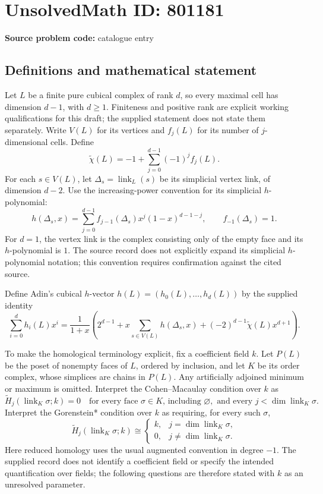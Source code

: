 \documentclass[11pt]{article}
\begin{document}
\section*{UnsolvedMath ID: 801181}
\textbf{Source problem code:} catalogue entry
\subsection{Definitions and mathematical statement}
Let \(L\) be a finite pure cubical complex of rank \(d\), so every maximal cell has dimension \(d-1\), with \(d\geq 1\). Finiteness and positive rank are explicit working qualifications for this draft; the supplied statement does not state them separately. Write \(V(L)\) for its vertices and \(f_j(L)\) for its number of \(j\)-dimensional cells. Define
\[
\widetilde\chi(L)=-1+\sum_{j=0}^{d-1}(-1)^j f_j(L).
\]
For each \(s\in V(L)\), let \(\Delta_s=\operatorname{link}_L(s)\) be its simplicial vertex link, of dimension \(d-2\). Use the increasing-power convention for its simplicial \(h\)-polynomial:
\[
h(\Delta_s,x)=\sum_{j=0}^{d-1} f_{j-1}(\Delta_s)x^j(1-x)^{d-1-j},\qquad f_{-1}(\Delta_s)=1.
\]
For \(d=1\), the vertex link is the complex consisting only of the empty face and its \(h\)-polynomial is \(1\). The source record does not explicitly expand its simplicial \(h\)-polynomial notation; this convention requires confirmation against the cited source.

Define Adin's cubical \(h\)-vector \(h(L)=(h_0(L),\ldots,h_d(L))\) by the supplied identity
\[
\sum_{i=0}^{d}h_i(L)x^i
=\frac{1}{1+x}\left(
2^{d-1}+x\sum_{s\in V(L)}h(\Delta_s,x)
+(-2)^{d-1}\widetilde\chi(L)x^{d+1}
\right).
\]

To make the homological terminology explicit, fix a coefficient field \(k\). Let \(P(L)\) be the poset of nonempty faces of \(L\), ordered by inclusion, and let \(K\) be its order complex, whose simplices are chains in \(P(L)\). Any artificially adjoined minimum or maximum is omitted. Interpret the Cohen--Macaulay condition over \(k\) as
\[
\widetilde H_j(\operatorname{link}_K\sigma;k)=0
\quad\text{for every face }\sigma\in K\text{, including }\varnothing,
\text{ and every }j<\dim\operatorname{link}_K\sigma.
\]
Interpret the Gorenstein* condition over \(k\) as requiring, for every such \(\sigma\),
\[
\widetilde H_j(\operatorname{link}_K\sigma;k)\cong
\begin{cases}
k,&j=\dim\operatorname{link}_K\sigma,\\
0,&j\neq\dim\operatorname{link}_K\sigma.
\end{cases}
\]
Here reduced homology uses the usual augmented convention in degree \(-1\). The supplied record does not identify a coefficient field or specify the intended quantification over fields; the following questions are therefore stated with \(k\) as an unresolved parameter.
\end{document}

